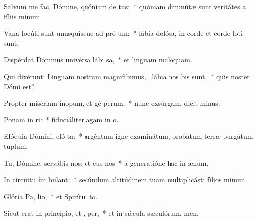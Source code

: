 \item Salvum me fac, Dómine, quóniam de tus:~* quóniam diminútæ sunt veritátes a fíliis minum.
\item Vana locúti sunt unusquísque ad pró um:~* lábia dolósa, in corde et corde loti sunt.
\item Dispérdat Dóminus univérsa lábi sa,~* et linguam maloquam.
\item Qui dixérunt: Linguam nostram magnifibimus,~\pscross{} lábia nos  bis sunt,~* quis noster Dómi est?
\item Propter misériam ínopum, et gé perum,~* nunc exsúrgam, dicit minus.
\item Ponam in ri:~* fiduciáliter agam in o.
\item Elóquia Dómini, eló ta:~* argéntum igne examinátum, probátum terræ purgátum tuplum.
\item Tu, Dómine, servábis nos: et cus nos~* a generatióne hac in ænum.
\item In circúitu ím bulant:~* secúndum altitúdinem tuam multiplicásti fílios minum.
\item Glória Pa,  lio,~* et Spirítui to.
\item Sicut erat in princípio, et ,  per,~* et in sǽcula sæculórum. men.
